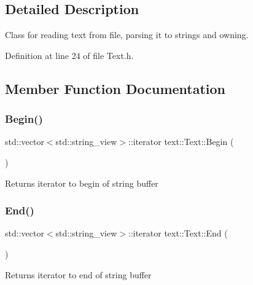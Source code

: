 \subsection{Detailed Description}
Class for reading text from file, parsing it to strings and owning. 

Definition at line 24 of file Text.\+h.



\subsection{Member Function Documentation}
\mbox{\label{classtext_1_1Text_a4ba572712a8385afd4328c6309259cee}} 
\subsubsection{\texorpdfstring{Begin()}{Begin()}}
{\footnotesize\ttfamily std\+::vector$<$std\+::string\+\_\+view$>$\+::iterator text\+::\+Text\+::\+Begin (\begin{DoxyParamCaption}{ }\end{DoxyParamCaption})}

\begin{DoxyReturn}{Returns}
iterator to begin of string buffer 
\end{DoxyReturn}
\mbox{\label{classtext_1_1Text_a8fa95460b2eb9bce2d58ffd28e69853c}} 
\subsubsection{\texorpdfstring{End()}{End()}}
{\footnotesize\ttfamily std\+::vector$<$std\+::string\+\_\+view$>$\+::iterator text\+::\+Text\+::\+End (\begin{DoxyParamCaption}{ }\end{DoxyParamCaption})}

\begin{DoxyReturn}{Returns}
iterator to end of string buffer 
\end{DoxyReturn}
\mbox{\label{classtext_1_1Text_abb1307cded199041ad25ecba697e8fa5}} 
